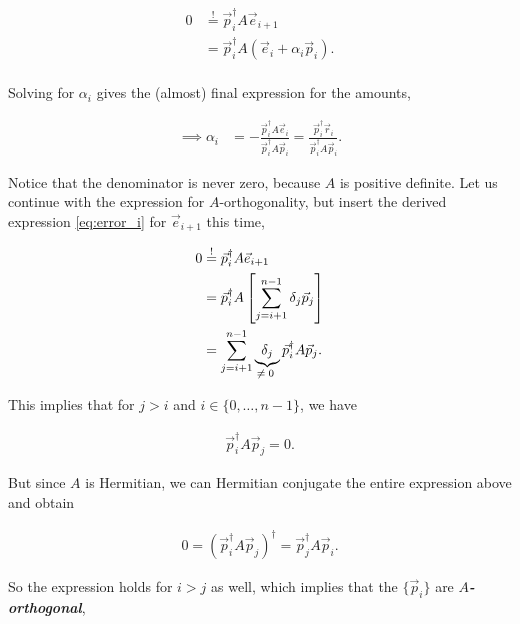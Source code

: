 \documentclass{article}
\theoremstyle{plain} %
\theoremstyle{convention} %
\theoremstyle{remark} %
\def\df#1{\textbf{\textit{#1}}}
\numberwithin{equation}{section}
\begin{document}
\begin{align*}
    0 &\stackrel{!}{=} \vec{p}_i^{\dagger} A \vec{e}_{i+1} \\
                    &= \vec{p}_i^{\dagger} A ( \vec{e}_{i} + \alpha_i \vec{p}_i ). \\
\end{align*}


Solving for $\alpha_i$ gives the (almost) final expression for the amounts,

\begin{align}
      \implies         \alpha_i &= - \frac{ \vec{p}_i^{\dagger} A \vec{e}_{i} }{ \vec{p}_i^{\dagger} A \vec{p}_i } = \frac{ \vec{p}_i^{\dagger} \vec{r}_{i} }{ \vec{p}_i^{\dagger} A \vec{p}_i }. \label{eq:cgne:alpha_pre}
\end{align}

Notice that the denominator is never zero, because $A$ is positive definite. Let us continue with the expression for $A$-orthogonality, but insert the derived expression \eqref{eq:error_i} for $\vec{e}_{i+1}$ this time,

\begin{align*}
    0 &\stackrel{!}{=} \vec{p}_i^{\dagger} A \vec{e}_{i+1} \\
                    &= \vec{p}_i^{\dagger} A \left[ \sum_{j=i+1}^{n-1} \delta_j \vec{p}_j \right] \\
                    &= \sum_{j=i+1}^{n-1} \underbrace{ \delta_j }_{\text{\makebox[0pt]{$\neq 0$} }} \vec{p}_i^{\dagger} A \vec{p}_j.
\end{align*}

This implies that for $j>i$ and $i \in \{0, \dots, n-1\}$, we have

\begin{align*}
    \vec{p}_i^{\dagger} A \vec{p}_j = 0.
\end{align*}

But since $A$ is Hermitian, we can Hermitian conjugate the entire expression above and obtain

\begin{align*}
    0 = \left( \vec{p}_i^{\dagger} A \vec{p}_j \right)^{\dagger} = \vec{p}_j^{\dagger} A \vec{p}_i.
\end{align*}

So the expression holds for $i>j$ as well, which implies that the $\{\vec{p}_i\}$ are \df{$A$-orthogonal},
\end{document}
